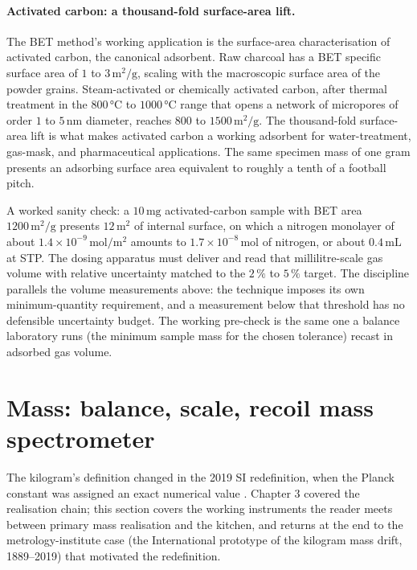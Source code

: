 \paragraph{Activated carbon: a thousand-fold surface-area lift.}
The BET method's working application is the surface-area
characterisation of activated carbon, the canonical adsorbent. Raw
charcoal has a BET specific surface area of $1$ to $3 \,\si{
\meter\squared\per\gram}$, scaling with the macroscopic surface area
of the powder grains. Steam-activated or chemically activated
carbon, after thermal treatment in the $800 \,\si{\degreeCelsius}$
to $1000 \,\si{\degreeCelsius}$ range that opens a network of
micropores of order $1$ to $5 \,\si{\nano\meter}$ diameter, reaches
$800$ to $1500 \,\si{\meter\squared\per\gram}$. The thousand-fold
surface-area lift is what makes activated carbon a working
adsorbent for water-treatment, gas-mask, and pharmaceutical
applications. The same specimen mass of one gram presents an
adsorbing surface area equivalent to roughly a tenth of a football
pitch.

A worked sanity check: a $10 \,\si{\milli\gram}$ activated-carbon
sample with BET area $1200 \,\si{\meter\squared\per\gram}$ presents
$12 \,\si{\meter\squared}$ of internal surface, on which a nitrogen
monolayer of about $1.4 \times 10^{-9} \,\si{\mole\per\meter
\squared}$ amounts to $1.7 \times 10^{-8} \,\si{\mole}$ of nitrogen,
or about $0.4 \,\si{\milli\liter}$ at STP. The dosing apparatus must
deliver and read that millilitre-scale gas volume with relative
uncertainty matched to the $2\,\%$ to $5\,\%$ target. The
discipline parallels the volume measurements above: the technique
imposes its own minimum-quantity requirement, and a measurement
below that threshold has no defensible uncertainty budget. The
working pre-check is the same one a balance laboratory runs (the
minimum sample mass for the chosen tolerance) recast in adsorbed
gas volume.

\section{Mass: balance, scale, recoil mass spectrometer}

The kilogram's definition changed in the 2019 SI redefinition, when
the Planck constant was assigned an exact numerical value
\cite{std:bipm-si2019,paper:stock-kibble-2018}. Chapter 3 covered the
realisation chain; this section covers the working instruments the
reader meets between primary mass realisation and the kitchen, and
returns at the end to the metrology-institute case (the
International prototype of the kilogram mass drift, 1889--2019) that
motivated the redefinition.

